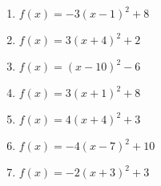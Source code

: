 \documentclass{article}%
\begin{document}
\begin{enumerate}[label=\alph*)]
\item%
\newline\vspace{0.5cm} $f(x)=-3(x-1)^2 +8$%
\item%
\newline\vspace{0.5cm} $f(x)=3(x+4)^2 +2$%
\item%
\newline\vspace{0.5cm} $f(x)=(x-10)^2 -6$%
\item%
\newline\vspace{0.5cm} $f(x)=3(x+1)^2 +8$%
\item%
\newline\vspace{0.5cm} $f(x)=4(x+4)^2 +3$%
\item%
\newline\vspace{0.5cm} $f(x)=-4(x-7)^2 +10$%
\item%
\newline\vspace{0.5cm} $f(x)=-2(x+3)^2 +3$%
\end{enumerate}

%
\end{document}
